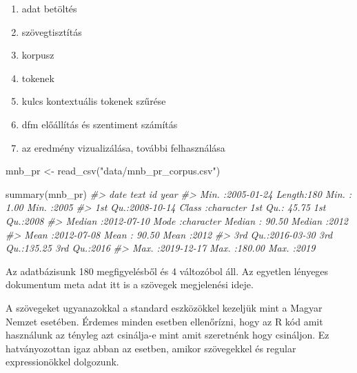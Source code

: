 \documentclass[
]{book}
\newenvironment{Shaded}{\begin{snugshade}}{\end{snugshade}}
\newcommand{\CommentTok}[1]{\textcolor[rgb]{0.56,0.35,0.01}{\textit{#1}}}
\newcommand{\FunctionTok}[1]{\textcolor[rgb]{0.00,0.00,0.00}{#1}}
\newcommand{\NormalTok}[1]{#1}
\newcommand{\OtherTok}[1]{\textcolor[rgb]{0.56,0.35,0.01}{#1}}
\newcommand{\StringTok}[1]{\textcolor[rgb]{0.31,0.60,0.02}{#1}}
\providecommand{\tightlist}{%
  \setlength{\itemsep}{0pt}\setlength{\parskip}{0pt}}
\begin{document}
\begin{enumerate}
\def\labelenumi{\arabic{enumi}.}
\tightlist
\item
  adat betöltés
\item
  szövegtisztítás
\item
  korpusz
\item
  tokenek
\item
  kulcs kontextuális tokenek szűrése
\item
  dfm előállítás és szentiment számítás
\item
  az eredmény vizualizálása, további felhasználása
\end{enumerate}

\begin{Shaded}
\begin{Highlighting}[]
\NormalTok{mnb\_pr }\OtherTok{\textless{}{-}} \FunctionTok{read\_csv}\NormalTok{(}\StringTok{"data/mnb\_pr\_corpus.csv"}\NormalTok{)}

\FunctionTok{summary}\NormalTok{(mnb\_pr)}
\CommentTok{\#\textgreater{}       date                text                 id              year     }
\CommentTok{\#\textgreater{}  Min.   :2005{-}01{-}24   Length:180         Min.   :  1.00   Min.   :2005  }
\CommentTok{\#\textgreater{}  1st Qu.:2008{-}10{-}14   Class :character   1st Qu.: 45.75   1st Qu.:2008  }
\CommentTok{\#\textgreater{}  Median :2012{-}07{-}10   Mode  :character   Median : 90.50   Median :2012  }
\CommentTok{\#\textgreater{}  Mean   :2012{-}07{-}08                      Mean   : 90.50   Mean   :2012  }
\CommentTok{\#\textgreater{}  3rd Qu.:2016{-}03{-}30                      3rd Qu.:135.25   3rd Qu.:2016  }
\CommentTok{\#\textgreater{}  Max.   :2019{-}12{-}17                      Max.   :180.00   Max.   :2019}
\end{Highlighting}
\end{Shaded}

Az adatbázisunk 180 megfigyelésből és 4 változóbol áll. Az egyetlen
lényeges dokumentum meta adat itt is a szövegek megjelenési ideje.

A szövegeket ugyanazokkal a standard eszközökkel kezeljük mint a Magyar
Nemzet esetében. Érdemes minden esetben ellenőrízni, hogy az R kód amit
használunk az tényleg azt csinálja-e mint amit szeretnénk hogy
csináljon. Ez hatványozottan igaz abban az esetben, amikor szövegekkel
és regular expressionökkel dolgozunk.
\end{document}
